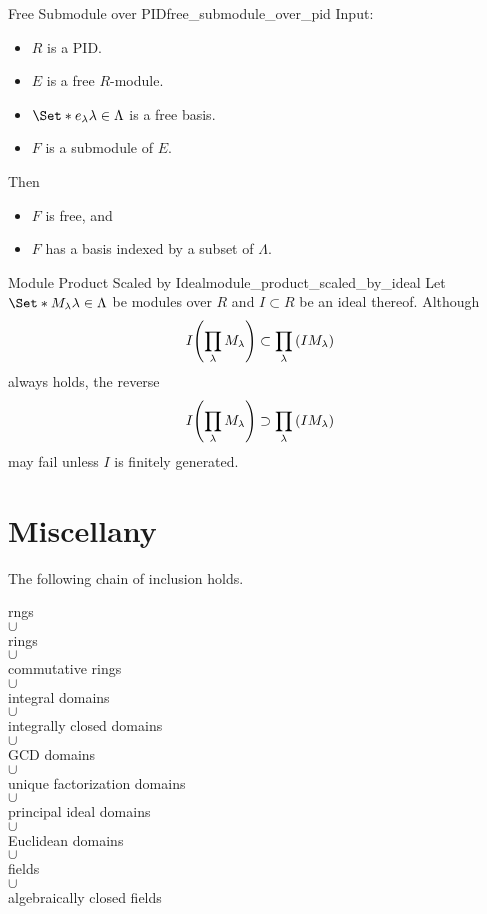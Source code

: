 \documentclass{article}
\begin{document}
\begin{theorem}{Free Submodule over PID}{free_submodule_over_pid}
    Input:
    \begin{itemize}
        \item $R$ is a PID.
        \item $E$ is a free $R$-module.
        \item $\Set*{e_\lambda}{\lambda\in\Lambda}$ is a free basis.
        \item $F$ is a submodule of $E$.
    \end{itemize}
    Then
    \begin{itemize}
        \item $F$ is free, and
        \item $F$ has a basis indexed by a subset of $\Lambda$.
    \end{itemize}
\end{theorem}

\begin{counterexample}{Module Product Scaled by Ideal}{module_product_scaled_by_ideal}
    Let $\Set*{M_\lambda}{\lambda\in\Lambda}$ be modules over $R$ and $I\subset R$ be an ideal thereof.
    Although
    \[ I\qty(\prod_\lambda M_\lambda) \subset \prod_\lambda \qty(I M_\lambda) \]
    always holds, the reverse
    \[ I\qty(\prod_\lambda M_\lambda) \supset \prod_\lambda \qty(I M_\lambda) \]
    may fail unless $I$ is finitely generated.
\end{counterexample}

\section*{Miscellany}

The following chain of inclusion holds.
\begin{center}
    rngs \\
    $\cup$ \\
    rings \\
    $\cup$  \\
    commutative rings  \\
    $\cup$  \\
    integral domains \\
    $\cup$  \\
    integrally closed domains \\
    $\cup$  \\
    GCD domains \\
    $\cup$  \\
    unique factorization domains \\
    $\cup$  \\
    principal ideal domains \\
    $\cup$  \\
    Euclidean domains \\
    $\cup$  \\
    fields \\
    $\cup$  \\
    algebraically closed fields \\
\end{center}
\end{document}
